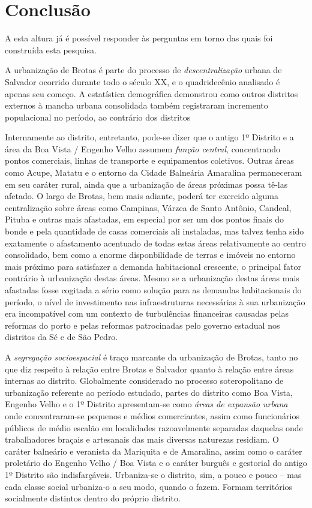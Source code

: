 \chapter*[Conclusão]{Conclusão}\label{concl}


A esta altura já é possível responder às perguntas em torno das quais foi construída esta pesquisa.

A urbanização de Brotas é parte do processo de \textit{descentralização} urbana de Salvador ocorrido durante todo o século XX, e o quadridecênio analisado é apenas seu começo. A estatística demográfica demonstrou como outros distritos externos à mancha urbana consolidada também registraram incremento populacional no período, ao contrário dos distritos 

Internamente ao distrito, entretanto, pode-se dizer que o antigo 1º Distrito e a área da Boa Vista / Engenho Velho assumem \textit{função central}, concentrando pontos comerciais, linhas de transporte e equipamentos coletivos. Outras áreas como Acupe, Matatu e o entorno da Cidade Balneária Amaralina permaneceram em seu caráter rural, ainda que a urbanização de áreas próximas possa tê-las afetado. O largo de Brotas, bem mais adiante, poderá ter exercido alguma centralização sobre áreas como Campinas, Várzea de Santo Antônio, Candeal, Pituba e outras mais afastadas, em especial por ser um dos pontos finais do bonde e pela quantidade de casas comerciais ali instaladas, mas talvez tenha sido exatamente o afastamento acentuado de todas estas áreas relativamente ao centro consolidado, bem como a enorme disponbilidade de terras e imóveis no entorno mais próximo para satisfazer a demanda habitacional crescente, o principal fator contrário à urbanização destas áreas. Mesmo se a urbanização destas áreas mais afastadas fosse cogitada a sério como solução para as demandas habitacionais do período, o nível de investimento nas infraestruturas necessárias à sua urbanização era incompatível com um contexto de turbulências financeiras causadas pelas reformas do porto e pelas reformas patrocinadas pelo governo estadual nos distritos da Sé e de São Pedro.

A \textit{segregação socioespacial} é traço marcante da urbanização de Brotas, tanto no que diz respeito à relação entre Brotas e Salvador quanto à relação entre áreas internas ao distrito. Globalmente considerado no processo soteropolitano de urbanização referente ao período estudado, partes do distrito como Boa Vista, Engenho Velho e o 1º Distrito apresentam-se como \textit{áreas de expansão urbana} onde concentraram-se pequenos e médios comerciantes, assim como funcionários públicos de médio escalão em localidades razoavelmente separadas daquelas onde trabalhadores braçais e artesanais das mais diversas naturezas residiam. O caráter balneário e veranista da Mariquita e de Amaralina, assim como o caráter proletário do Engenho Velho / Boa Vista e o caráter burguês e gestorial do antigo 1º Distrito são indisfarçáveis. Urbaniza-se o distrito, sim, a pouco e pouco -- mas cada classe social urbaniza-o a seu modo, quando o fazem. Formam territórios socialmente distintos dentro do próprio distrito.

